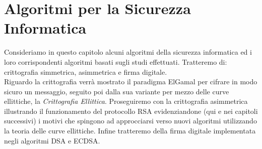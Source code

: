 \documentclass[a4paper,12pt]{tesiinfo}
\begin{document}
%
%
%
%
%
%
%
%
%
%
%
%
%
%
%
%
%
%
%
%
%
%
%
\chapter{Algoritmi per la Sicurezza Informatica}
\label{ecc algo}
Consideriamo in questo capitolo alcuni algoritmi della sicurezza informatica ed i loro corrispondenti algoritmi basati sugli studi effettuati. Tratteremo di: crittografia simmetrica, asimmetrica e firma digitale.
\\
Riguardo la crittografia verr\`a mostrato il paradigma ElGamal per cifrare in modo sicuro un messaggio, seguito poi dalla sua variante per mezzo delle curve ellittiche, la \textit{Crittografia Ellittica}. Proseguiremo con la crittografia asimmetrica illustrando il funzionamento del protocollo RSA evidenziandone (qui e nei capitoli successivi) i motivi che spingono ad approcciarsi verso nuovi algoritmi utilizzando la teoria delle curve ellittiche. Infine tratteremo della firma digitale implementata negli algoritmi DSA e ECDSA.
%
%
%
%
%
%
%
%
%
%
%
%
\end{document}
